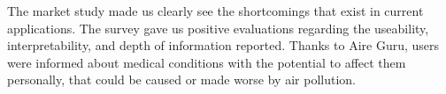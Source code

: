 \begin{itemize}
    \done The market study made us clearly see the shortcomings that exist in current applications.
    \done The survey gave us positive evaluations regarding the useability, interpretability, and depth of information reported.
    \done Thanks to Aire Guru, users were informed about medical conditions with the potential to affect them personally, that could be caused or made worse by air pollution.

\end{itemize}
 

\newpage